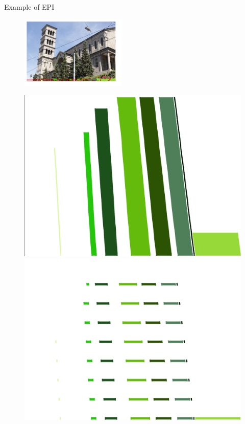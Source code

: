 \begin{frame}{Example of EPI}
\begin{figure}[h!]
\includegraphics[width=0.45\textwidth]{./images/EPI-strip.png}
\end{figure}
\pause
\begin{figure}[!tbp]
  \centering
  \begin{minipage}[b]{0.45\textwidth}
    \includegraphics[width=\textwidth]{./images/EPI-dense.png}
  \end{minipage}
	\pause
  \begin{minipage}[b]{0.45\textwidth}
    \includegraphics[width=\textwidth]{./images/EPI-sparse.png}
  \end{minipage}
\end{figure}

\end{frame}


